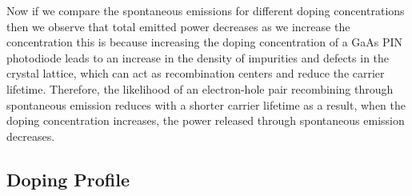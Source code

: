 \documentclass[conference]{IEEEtran}
\begin{document}
Now if we compare the spontaneous emissions for different doping concentrations then we observe that total emitted power decreases as we increase the concentration this is because increasing the doping concentration of a GaAs PIN photodiode leads to an increase in the density of impurities and defects in the crystal lattice, which can act as recombination centers and reduce the carrier lifetime. Therefore, the likelihood of an electron-hole pair recombining through spontaneous emission reduces with a shorter carrier lifetime as a result, when the doping concentration increases, the power released through spontaneous emission decreases.


\subsection{Doping Profile}
\end{document}
